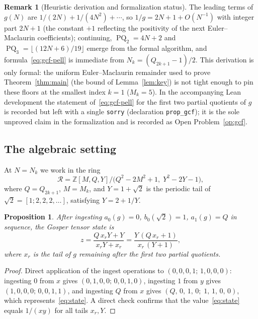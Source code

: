 \documentclass[12pt]{amsart}
\newtheorem{proposition}[theorem]{Proposition}
\theoremstyle{definition}
\newtheorem{remark}[theorem]{Remark}
\newcommand{\floor}[1]{\lfloor #1 \rfloor}
\newcommand{\Z}{\mathbb{Z}}
\DeclareMathOperator{\PQ}{PQ}
\begin{document}
\begin{remark}[Heuristic derivation and formalization status]
  The leading terms of $g(N)$ are $1/(2N) + 1/(4N^2) + \cdots$, so
  $1/g = 2N+1 + O(N^{-1})$ with integer part $2N+1$ (the constant $+1$
  reflecting the positivity of the next Euler--Maclaurin coefficients);
  continuing, $\PQ_2 = 4N+2$ and $\PQ_3 = \floor{(12N+6)/19}$ emerge from
  the formal algorithm, and formula~\eqref{eq:gcf-pell} is immediate from
  $N_k = (Q_{2k+1}-1)/2$.  This derivation is only formal: the uniform
  Euler--Maclaurin remainder used to prove Theorem~\ref{thm:main} (the
  bound of Lemma~\ref{lem:key}) is not tight enough to pin these floors at
  the smallest index $k = 1$ ($M_k = 5$).  In the accompanying Lean
  development the statement of~\eqref{eq:gcf-pell} for the first two partial
  quotients of $g$ is recorded but left with a single \texttt{sorry}
  (declaration \texttt{prop\_gcf}); it is the sole unproved claim in the
  formalization and is recorded as Open Problem~\ref{op:gcf}.
\end{remark}

\subsection{The algebraic setting}

At $N = N_k$ we work in the ring
\[
  \mathcal{R} = \Z[M, Q, Y]\big/\bigl(Q^2-2M^2+1,\; Y^2-2Y-1\bigr),
\]
where $Q = Q_{2k+1}$, $M = M_k$, and $Y = 1+\sqrt{2}$ is the periodic
tail of $\sqrt{2} = [1;2,2,2,\ldots]$, satisfying $Y = 2 + 1/Y$.

\begin{proposition}\label{prop:gosper-state}
  After ingesting $a_0(g)=0$, $b_0(\sqrt{2})=1$, $a_1(g)=Q$ in
  sequence, the Gosper tensor state is
  \begin{equation}\label{eq:state}
    z = \frac{Q\,x_r Y + Y}{x_r Y + x_r}
      = \frac{Y\,(Q\,x_r + 1)}{x_r\,(Y+1)},
  \end{equation}
  where $x_r$ is the tail of $g$ remaining after the first two
  partial quotients.
\end{proposition}

\begin{proof}
  Direct application of the ingest operations to $(0,0,0,1;\,1,0,0,0)$:
  ingesting $0$ from $x$ gives $(0,1,0,0;\,0,0,1,0)$, ingesting $1$ from
  $y$ gives $(1,0,0,0;\,0,0,1,1)$, and ingesting $Q$ from $x$ gives
  $(Q,\,0,\,1,\,0;\;1,\,1,\,0,\,0)$, which represents~\eqref{eq:state}.
  A direct check confirms that the value~\eqref{eq:state} equals $1/(xy)$
  for all tails $x_r, Y$.
\end{proof}
\end{document}
